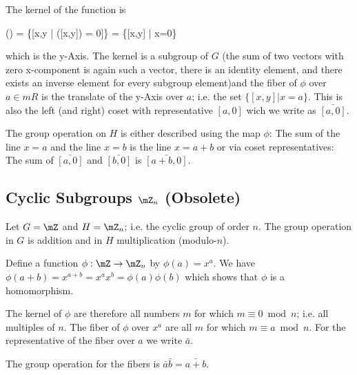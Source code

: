 The kernel of the function is

\bee
{}(\phi) = \{[x,y | \phi([x,y]) = 0]\} = \{[x,y] | x=0\}
\eee

which is the y-Axis. The kernel is a subgroup of $G$ (the sum of two vectors with zero x-component is again such a vector, there is an identity element, and there exists an inverse element for every subgroup element)and the fiber of $\phi$ over $a \in mR$ is the translate of the y-Axis over $a$; i.e. the set $\{[x,y] | x=a\}$. This is also the left (and right) coset with representative $[a,0]$ wich we write as $\bar{[a,0]}$.

The group operation on $H$ is either described using the map $\phi$: The sum of the line $x=a$ and the line $x=b$ is the line $x=a+b$ or via coset representatives: The sum of $\bar{[a,0]}$ and $\bar{[b,0]}$ is $\bar{[a+b,0]}$.

\subsection{Cyclic Subgroups $\mZ_n$ (Obsolete)}

Let $G = \mZ$ and $H = \mZ_n$; i.e. the cyclic group of order $n$. The group operation in $G$ is addition and in $H$ multiplication (modulo-$n$).

Define a function $\phi: \mZ \rightarrow \mZ_n$ by $\phi(a) = x^a$. We have $\phi(a + b) = x^{a+b} = x^a x^b = \phi(a) \phi(b)$ which shows that $\phi$ is a homomorphism.

The kernel of $\phi$ are therefore all numbers $m$ for which $m \equiv 0 \bmod n$; i.e. all multiples of $n$. The fiber of $\phi$ over $x^a$ are all $m$ for which $m \equiv a \bmod n$. For the representative of the fiber over $a$ we write $\bar{a}$.

The group operation for the fibers is $\bar{a} \bar{b} = \bar{a+b}$.


